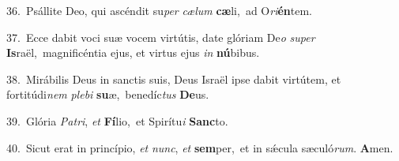 {\numbfont\textcolor{\numbcolor}{36.}}~Psállite Deo, qui ascéndit su\textit{per} \textit{cæ}\-\textit{lum} \textbf{cæ}\-li,~\star ad O\-\textit{ri}\-\textbf{én}tem.\par
{\numbfont\textcolor{\numbcolor}{37.}}~Ecce dabit voci suæ vocem virtútis, date glóriam De\textit{o} \textit{su}\-\textit{per} \textbf{Is}\-raël,~\star magnificéntia ejus, et virtus ejus \textit{in} \textbf{nú}\-bibus.\par
{\numbfont\textcolor{\numbcolor}{38.}}~Mirábilis Deus in sanctis suis, Deus Israël ipse dabit virtútem, et fortitúdi\textit{nem} \textit{ple}\-\textit{bi} \textbf{su}\-æ,~\star benedíc\textit{tus} \textbf{De}\-us.\par
{\numbfont\textcolor{\numbcolor}{39.}}~Glória \textit{Pa}\-\textit{tri}, \textit{et} \textbf{Fí}\-lio,~\star et Spirítu\textit{i} \textbf{Sanc}\-to.\par
{\numbfont\textcolor{\numbcolor}{40.}}~Sicut erat in princípio, \textit{et} \textit{nunc}\-, \textit{et} \textbf{sem}\-per,~\star et in sǽcula sæculó\-\textit{rum}\-. \textbf{A}\-men.\par
